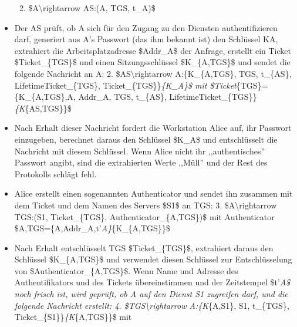 \documentclass[a4paper]{article}
\begin{document}
\begin{multicols}{3}
\begin{itemize}
              \begin{enumerate}
                  \def\labelenumi{\arabic{enumi}.}
                  \item
                        \$A\textbackslash rightarrow AS:(A, TGS, t\_A)\$
              \end{enumerate}
        \item
              Der AS prüft, ob A sich für den Zugang zu den Diensten
              authentifizieren darf, generiert aus A's Passwort (das ihm bekannt
              ist) den Schlüssel KA, extrahiert die Arbeitsplatzadresse \$Addr\_A\$
              der Anfrage, erstellt ein Ticket \$Ticket\_\{TGS\}\$ und einen
              Sitzungsschlüssel \$K\_\{A,TGS\}\$ und sendet die folgende Nachricht
              an A: 2. \$AS\textbackslash rightarrow A:\{K\_\{A,TGS\}, TGS,
              t\_\{AS\}, LifetimeTicket\_\{TGS\}, Ticket\_\{TGS\}\}\emph{\{K\_A\}\$
                  mit \$Ticket}\{TGS\}=\{K\_\{A,TGS\},A, Addr\_A, TGS, t\_\{AS\},
              LifetimeTicket\_\{TGS\}\}\emph{\{K}\{AS,TGS\}\}\$
        \item
              Nach Erhalt dieser Nachricht fordert die Workstation Alice auf, ihr
              Passwort einzugeben, berechnet daraus den Schlüssel \$K\_A\$ und
              entschlüsselt die Nachricht mit diesem Schlüssel. Wenn Alice nicht ihr
              ,,authentisches'' Passwort angibt, sind die extrahierten Werte
              ,,Müll'' und der Rest des Protokolls schlägt fehl.
        \item
              Alice erstellt einen sogenannten Authenticator und sendet ihn zusammen
              mit dem Ticket und dem Namen des Servers \$S1\$ an TGS: 3.
              \$A\textbackslash rightarrow TGS:(S1, Ticket\_\{TGS\},
              Authenticator\_\{A,TGS\})\$ mit Authenticator
              \$A,TGS=\{A,Addr\_A,t'\emph{A\}}\{K\_\{A,TGS\}\}\$
        \item
              Nach Erhalt entschlüsselt TGS \$Ticket\_\{TGS\}\$, extrahiert daraus
              den Schlüssel \$K\_\{A,TGS\}\$ und verwendet diesen Schlüssel zur
              Entschlüsselung von \$Authenticator\_\{A,TGS\}\$. Wenn Name und
              Adresse des Authentifikators und des Tickets übereinstimmen und der
              Zeitstempel \$t'\emph{A\$ noch frisch ist, wird geprüft, ob A auf den
                  Dienst S1 zugreifen darf, und die folgende Nachricht erstellt: 4.
                  \$TGS\textbackslash rightarrow A:\{K}\{A,S1\}, S1, t\_\{TGS\},
              Ticket\_\{S1\}\}\emph{\{K}\{A,TGS\}\}\$ mit

\end{itemize}
\end{multicols}
\end{document}
